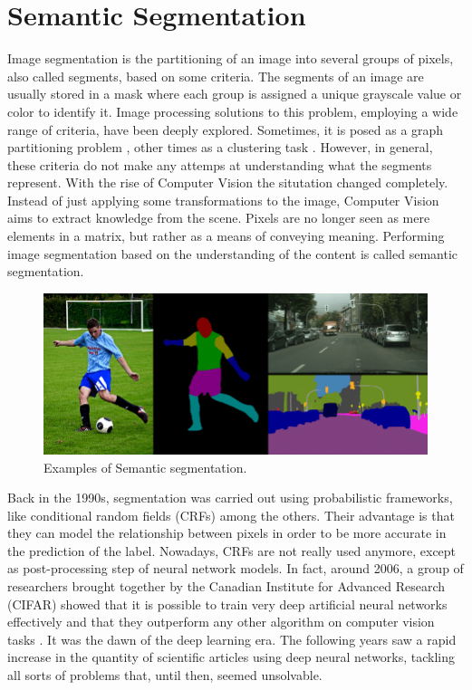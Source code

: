 \section{Semantic Segmentation}
\noindent Image segmentation is the partitioning of an image into several groups of pixels, also called segments, based on some criteria. The segments of an image are usually stored in a mask where each group is assigned a unique grayscale value or color to identify it. Image processing solutions to this problem, employing a wide range of criteria, have been deeply explored. Sometimes, it is posed as a graph partitioning problem \cite{shi2000normalized}, other times as a clustering task \cite{coleman1979image}. However, in general, these criteria do not make any attemps at understanding what the segments represent.
\bigbreak
\noindent With the rise of Computer Vision the situtation changed completely. Instead of just applying some transformations to the image, Computer Vision aims to extract knowledge from the scene. Pixels are no longer seen as mere elements in a matrix, but rather as a means of conveying meaning. Performing image segmentation based on the understanding of the content is called semantic segmentation.
\bigbreak
\begin{figure}[t]
    \centering
    \captionsetup{justification=centering}
    \includegraphics[width=\textwidth]{./pictures/segmentation-masks}
    \caption{Examples of Semantic segmentation.}
    \label{fig:segmentation-masks}
\end{figure}
\noindent Back in the 1990s, segmentation was carried out using probabilistic frameworks, like conditional random fields (CRFs) among the others. Their advantage is that they can model the relationship between pixels in order to be more accurate in the prediction of the label. Nowadays, CRFs are not really used anymore, except as post-processing step of neural network models. In fact, around 2006, a group of researchers brought together by the Canadian Institute for Advanced Research (CIFAR) showed that it is possible to train very deep artificial neural networks effectively \cite{hinton2006fast} and that they outperform any other algorithm on computer vision tasks \cite{hinton2006reducing}. It was the dawn of the deep learning era. The following years saw a rapid increase in the quantity of scientific articles using deep neural networks, tackling all sorts of problems that, until then, seemed unsolvable.
